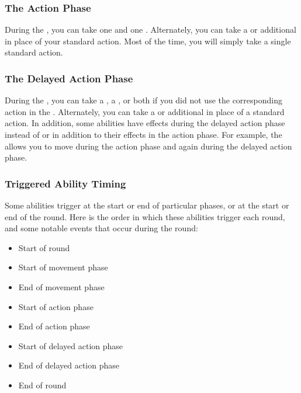         \subsubsection{The Action Phase}\label{The Action Phase}
            During the , you can take one  and one .
            Alternately, you can take a  or additional  in place of your standard action.
            Most of the time, you will simply take a single standard action.

        \subsubsection{The Delayed Action Phase}\label{The Delayed Action Phase}
            During the , you can take a , a , or both if you did not use the corresponding action in the .
            Alternately, you can take a  or additional  in place of a standard action.
            In addition, some abilities have effects during the delayed action phase instead of or in addition to their effects in the action phase.
            For example, the   allows you to move during the action phase and again during the delayed action phase.

        \subsubsection{Triggered Ability Timing}\label{Triggered Ability Timing}
            Some abilities trigger at the start or end of particular phases, or at the start or end of the round.
            Here is the order in which these abilities trigger each round, and some notable events that occur during the round:
            \begin{itemize}
                \item Start of round
                \item Start of movement phase
                \item End of movement phase
                \item Start of action phase
                \item End of action phase
                \item Start of delayed action phase
                \item End of delayed action phase
                \item End of round
            \end{itemize}

